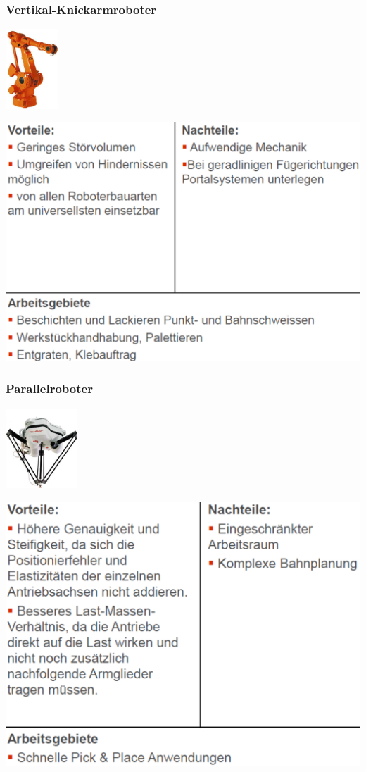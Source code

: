 \begin{minipage}{0.33\linewidth}
    \subsubsection{Vertikal-Knickarmroboter}
\includegraphics[height=3cm]{./bilder/KnickarmRoboBsp}

\includegraphics[width=\linewidth]{./bilder/KnickarmRobo}
\end{minipage}
\begin{minipage}{0.33\linewidth}
    \subsubsection{Parallelroboter}
    \includegraphics[height=3cm]{./bilder/ParallelRoboBsp}
    
    \includegraphics[width=\linewidth]{./bilder/ParallelRobo}
\end{minipage}

